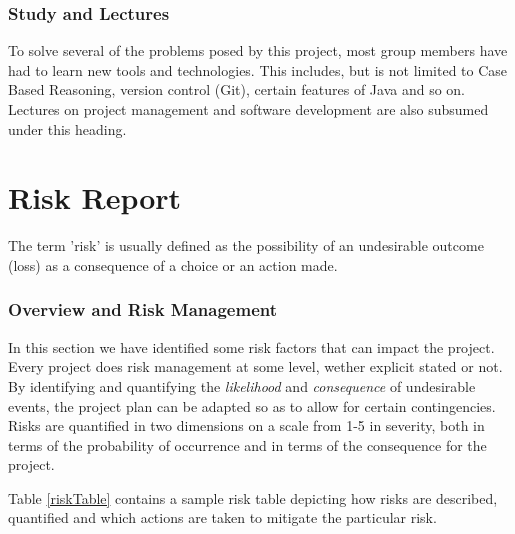 \subsubsection{Study and Lectures}
To solve several of the problems posed by this project, most group members have had to learn new tools and technologies. This includes, but is not limited to Case Based Reasoning, version control (Git), certain features of Java and so on. Lectures on project management  and software development are also subsumed under this heading.

\section{Risk Report}\label{riskReport}
The term 'risk' is usually defined as the possibility of an undesirable outcome (loss) as a consequence of a choice or an action made. 


\subsubsection{Overview and Risk Management}
In this section we have identified some risk factors that can impact the project. Every project does risk management at some level, wether explicit stated or not. By identifying and quantifying the \emph{likelihood} and \emph{consequence} of undesirable events, the project plan can be adapted so as to allow for certain contingencies. Risks are quantified in two dimensions on a scale from 1-5 in severity, both in terms of the probability of occurrence and in terms of the consequence for the project.

Table \ref{riskTable} contains a sample risk table depicting how risks are described, quantified and which actions are taken to mitigate the particular risk. 


